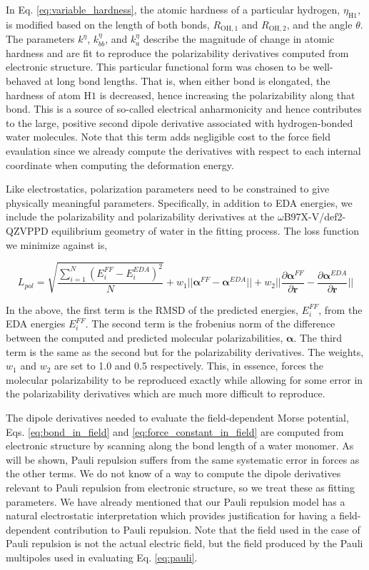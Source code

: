 \documentclass[journal=jctcce,manuscript=article]{achemso}
\begin{document}
In Eq. \ref{eq:variable_hardness}, the atomic hardness of a particular hydrogen, $\eta_{\mathrm{H1}}$, is modified based on the length of both  bonds, $R_{\mathrm{OH,1}}$ and $R_{\mathrm{OH,2}}$, and the angle $\theta$. The parameters $k^\eta$, $k^\eta_{bb}$, and $k^\eta_{a}$ describe the magnitude of change in atomic hardness and are fit to reproduce the polarizability derivatives computed from electronic structure. This particular functional form was chosen to be well-behaved at long bond lengths. That is, when either bond is elongated, the hardness of atom $\mathrm{H1}$ is decreased, hence increasing the polarizability along that bond. This is a source of so-called electrical anharmonicity and hence contributes to the large, positive second dipole derivative associated with hydrogen-bonded water molecules.\cite{mccoy2014role} Note that this term adds negligible cost to the force field evaulation since we already compute the derivatives with respect to each internal coordinate when computing the deformation energy.

Like electrostatics, polarization parameters need to be constrained to give physically meaningful parameters. Specifically, in addition to EDA energies, we include the polarizability and polarizability derivatives at the $\omega$B97X-V/def2-QZVPPD equilibrium geometry of water in the fitting process. The loss function we minimize against is,

\begin{equation}
  L_{pol}=\sqrt{\frac{\sum_{i=1}^{N}(E_i^{FF}-E_i^{EDA})^2}{N}} + w_1||\bm{\alpha}^{FF}-\bm{\alpha}^{EDA}||+w_2||\frac{\partial\bm{\alpha}^{FF}}{\partial \bm{r}}-\frac{\partial\bm{\alpha}^{EDA}}{\partial \bm{r}}||
\label{eq:pol_loss}
\end{equation}
\noindent

In the above, the first term is the RMSD of the predicted energies, $E_i^{FF}$, from the EDA energies $E_i^{FF}$. The second term is the frobenius norm of the difference between the computed and predicted molecular polarizabilities, $\bm{\alpha}$. The third term is the same as the second but for the polarizability derivatives. The weights, $w_1$ and $w_2$ are set to 1.0 and 0.5 respectively. This, in essence, forces the molecular polarizability to be reproduced exactly while allowing for some error in the polarizability derivatives which are much more difficult to reproduce.

The dipole derivatives needed to evaluate the field-dependent Morse potential, Eqs. \ref{eq:bond_in_field} and \ref{eq:force_constant_in_field} are computed from electronic structure by scanning along the  bond length of a water monomer. As will be shown, Pauli repulsion suffers from the same systematic error in forces as the other terms. We do not know of a way to compute the dipole derivatives relevant to Pauli repulsion from electronic structure, so we treat these as fitting parameters. We have already mentioned that our Pauli repulsion model has a natural electrostatic interpretation which provides justification for having a field-dependent contribution to Pauli repulsion. Note that the field used in the case of Pauli repulsion is not the actual electric field, but the field produced by the Pauli multipoles used in evaluating Eq. \ref{eq:pauli}.
\end{document}
